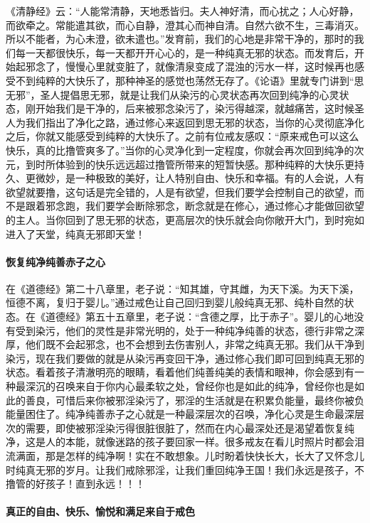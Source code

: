 《清静经》云：“人能常清静，天地悉皆归。夫人神好清，而心扰之；人心好静，而欲牵之。常能遣其欲，而心自静，澄其心而神自清。自然六欲不生，三毒消灭。所以不能者，为心未澄，欲未遣也。”发育前，我们的心地是非常干净的，那时的我们每一天都很快乐，每一天都开开心心的，是一种纯真无邪的状态。而发育后，开始起邪念了，慢慢心里就变脏了，就像清泉变成了混浊的污水一样，这时候再也感受不到纯粹的大快乐了，那种神圣的感觉也荡然无存了。《论语》里就专门讲到“思无邪”，圣人提倡思无邪，就是让我们从染污的心灵状态再次回到纯净的心灵状态，刚开始我们是干净的，后来被邪念染污了，染污得越深，就越痛苦，这时候圣人为我们指出了净化之路，通过修心来返回到思无邪的状态，当你的心灵彻底净化之后，你就又能感受到纯粹的大快乐了。之前有位戒友感叹：“原来戒色可以这么快乐，真的比撸管爽多了。”当你的心灵净化到一定程度，你就会再次回到纯净的次元，到时所体验到的快乐远远超过撸管所带来的短暂快感。那种纯粹的大快乐更持久、更微妙，是一种极致的美好，让人特别自由、快乐和幸福。有的人会说，人有欲望就要撸，这句话是完全错的，人是有欲望，但我们要学会控制自己的欲望，而不是跟着邪念跑，我们要学会断除邪念，断念就是在修心，通过修心才能做回欲望的主人。当你回到了思无邪的状态，更高层次的快乐就会向你敞开大门，到时宛如进入了天堂，纯真无邪即天堂！

\paragraph{恢复纯净纯善赤子之心}

在《道德经》第二十八章里，老子说：“知其雄，守其雌，为天下溪。为天下溪，恒德不离，复归于婴儿。”通过戒色让自己回归到婴儿般纯真无邪、纯朴自然的状态。在《道德经》第五十五章里，老子说：“含德之厚，比于赤子”。婴儿的心地没有受到染污，他们的灵性是非常光明的，处于一种纯净纯善的状态，德行非常之深厚，他们既不会起邪念，也不会想到去伤害别人，非常之纯真无邪。我们从干净到染污，现在我们要做的就是从染污再变回干净，通过修心我们即可回到纯真无邪的状态。看着孩子清澈明亮的眼睛，看着他们纯善纯美的表情和眼神，你会感到有一种最深沉的召唤来自于你内心最柔软之处，曾经你也是如此的纯净，曾经你也是如此的善良，可惜后来你被邪淫染污了，邪淫的生活就是在积累负能量，最终你被负能量困住了。纯净纯善赤子之心就是一种最深层次的召唤，净化心灵是生命最深层次的需要，即使被邪淫染污得很脏很脏了，然而在内心最深处还是渴望着恢复纯净，这是人的本能，就像迷路的孩子要回家一样。很多戒友在看儿时照片时都会泪流满面，那是怎样的纯净啊！实在不敢想象。儿时盼着快快长大，长大了又怀念儿时纯真无邪的岁月。让我们戒除邪淫，让我们重回纯净王国！我们永远是孩子，不撸管的好孩子！直到永远！！！

\paragraph{真正的自由、快乐、愉悦和满足来自于戒色}

